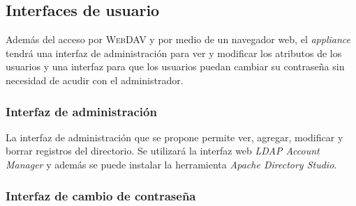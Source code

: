 %
%
%

      \subsection {Interfaces de usuario}

Adem\'{a}s del acceso por \textsc{\gls{WebDAV}} y por medio de un navegador web, el \textit{appliance} tendr\'{a} una interfaz de administraci\'{o}n para ver y modificar los atributos de los usuarios y una interfaz para que los usuarios puedan cambiar su contrase\~{n}a sin necesidad de acudir con el administrador.

        \subsubsection {Interfaz de administraci\'{o}n}

La interfaz de administraci\'{o}n que se propone permite ver, agregar, modificar y borrar registros del directorio. Se utilizar\'{a} la interfaz web \textit{LDAP Account Manager} y adem\'{a}s se puede instalar la herramienta \textit{Apache Directory Studio}.

        \subsubsection {Interfaz de cambio de contrase\~{n}a}

